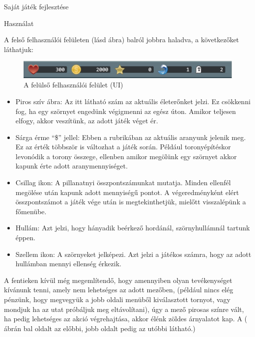 \begin{MyChapter}{Saját játék fejlesztése}
\begin{MySection}{Használat}
	
		A felső felhasználói felületen (lásd  ábra) balról jobbra haladva, a következőket láthatjuk:
		
		\begin{figure}[H]
			\centering
			\includegraphics[scale=0.58]{kepek/jatekHasznalat/felso_ui}
			\caption{A felülső felhasználói felület (UI) }
			\label{fig:jatekHasznalat:felso_ui}
		\end{figure}
		
		\begin{itemize}
			\item Piros szív ábra: Az itt látható szám az aktuális életerőnket jelzi. Ez csökkenni fog, ha egy szörnyet engedünk végigmenni az egész úton. Amikor teljesen elfogy, akkor veszítünk, az adott játék véget ér.
			
			\item Sárga érme ``\$'' jellel: Ebben a rubrikában az aktuális aranyunk jelenik meg. Ez az érték többször is változhat a játék során. Például toronyépítéskor levonódik a torony összege, ellenben amikor megölünk egy szörnyet akkor kapunk érte adott aranymennyiséget.
			
			\item Csillag ikon: A pillanatnyi összpontszámunkat mutatja. Minden ellenfél megölése után kapunk adott mennyiségű pontot. A végeredményként elért összpontszámot a játék vége után is megtekinthetjük, mielőtt visszalépünk a főmenübe.
			
			\item Hullám: Azt jelzi, hogy hányadik beérkező hordánál, szörnyhullámnál tartunk éppen.
			
			\item Szellem ikon: A szörnyeket jelképezi. Azt jelzi a játékos számra, hogy az adott hullámban mennyi ellenség érkezik.
		\end{itemize}
	
		A fentieken kívül még megemlítendő, hogy amennyiben olyan tevékenységet kívánunk tenni, amely nem lehetséges az adott mezőben, (például nincs elég pénzünk, hogy megvegyük a jobb oldali menüből kiválasztott tornyot, vagy mondjuk ha az utat próbáljuk meg eltávolítani), úgy a mező pirosas színre vált, ha pedig lehetséges az akció végrehajtása, akkor élénk zöldes árnyalatot kap. A ( ábrán bal oldalt az előbbi, jobb oldalt pedig az utóbbi látható.)
		

\end{MySection}
\end{MyChapter}
